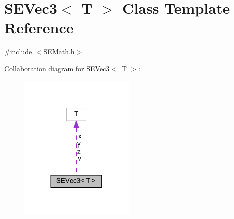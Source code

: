 \section{S\+E\+Vec3$<$ T $>$ Class Template Reference}
\label{class_s_e_vec3}


{\ttfamily \#include $<$S\+E\+Math.\+h$>$}



Collaboration diagram for S\+E\+Vec3$<$ T $>$\+:
\nopagebreak
\begin{figure}[H]
\begin{center}
\leavevmode
\includegraphics[width=156pt]{class_s_e_vec3__coll__graph}
\end{center}
\end{figure}
